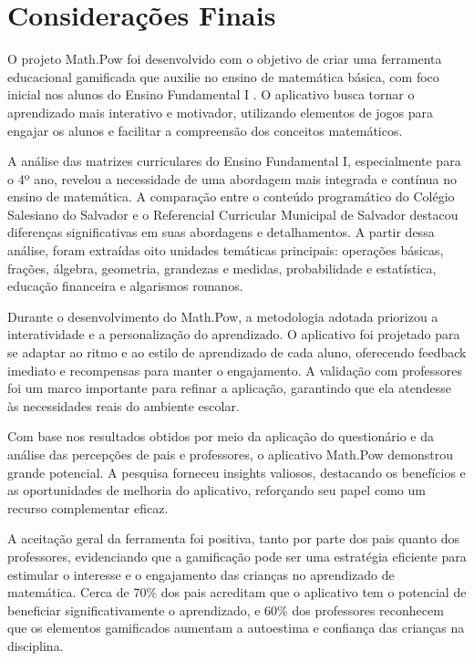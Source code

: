\chapter{Considerações Finais}\label{chp:conc}

O projeto Math.Pow foi desenvolvido com o objetivo de criar uma ferramenta educacional gamificada que auxilie no ensino de matemática básica, com foco inicial nos alunos do Ensino Fundamental I . O aplicativo busca tornar o aprendizado mais interativo e motivador, utilizando elementos de jogos para engajar os alunos e facilitar a compreensão dos conceitos matemáticos.

A análise das matrizes curriculares do Ensino Fundamental I, especialmente para o 4º ano, revelou a necessidade de uma abordagem mais integrada e contínua no ensino de matemática. A comparação entre o conteúdo programático do Colégio Salesiano do Salvador e o Referencial Curricular Municipal de Salvador destacou diferenças significativas em suas abordagens e detalhamentos. A partir dessa análise, foram extraídas oito unidades temáticas principais: operações básicas, frações, álgebra, geometria, grandezas e medidas, probabilidade e estatística, educação financeira e algarismos romanos.

Durante o desenvolvimento do Math.Pow, a metodologia adotada priorizou a interatividade e a personalização do aprendizado. O aplicativo foi projetado para se adaptar ao ritmo e ao estilo de aprendizado de cada aluno, oferecendo feedback imediato e recompensas para manter o engajamento. A validação com professores foi um marco importante para refinar a aplicação, garantindo que ela atendesse às necessidades reais do ambiente escolar.

Com base nos resultados obtidos por meio da aplicação do questionário e da análise das percepções de pais e professores, o aplicativo Math.Pow demonstrou grande potencial. A pesquisa forneceu insights valiosos, destacando os benefícios e as oportunidades de melhoria do aplicativo, reforçando seu papel como um recurso complementar eficaz.

A aceitação geral da ferramenta foi positiva, tanto por parte dos pais quanto dos professores, evidenciando que a gamificação pode ser uma estratégia eficiente para estimular o interesse e o engajamento das crianças no aprendizado de matemática. Cerca de 70\% dos pais acreditam que o aplicativo tem o potencial de beneficiar significativamente o aprendizado, e 60\% dos professores reconhecem que os elementos gamificados aumentam a autoestima e confiança das crianças na disciplina.

